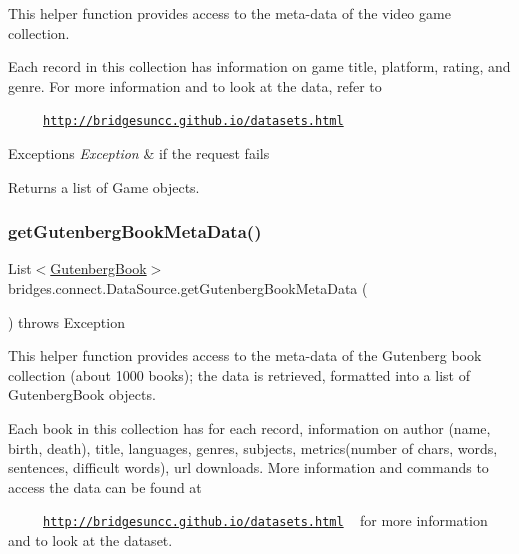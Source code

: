 This helper function provides access to the meta-\/data of the video game collection.

Each record in this collection has information on game title, platform, rating, and genre. For more information and to look at the data, refer to 

~~~~~\href{http://bridgesuncc.github.io/datasets.html}{\tt http\+://bridgesuncc.\+github.\+io/datasets.\+html} 


\begin{DoxyExceptions}{Exceptions}
{\em Exception} & if the request fails\\
\hline
\end{DoxyExceptions}
\begin{DoxyReturn}{Returns}
a list of Game objects. 
\end{DoxyReturn}
\mbox{\label{classbridges_1_1connect_1_1_data_source_aff3adc9d08624062469315f2fe059044}} 
\subsubsection{\texorpdfstring{get\+Gutenberg\+Book\+Meta\+Data()}{getGutenbergBookMetaData()}}
{\footnotesize\ttfamily List$<$\hyperlink{classbridges_1_1data__src__dependent_1_1_gutenberg_book}{Gutenberg\+Book}$>$ bridges.\+connect.\+Data\+Source.\+get\+Gutenberg\+Book\+Meta\+Data (\begin{DoxyParamCaption}{ }\end{DoxyParamCaption}) throws Exception}

This helper function provides access to the meta-\/data of the Gutenberg book collection (about 1000 books); the data is retrieved, formatted into a list of Gutenberg\+Book objects.

Each book in this collection has for each record, information on author (name, birth, death), title, languages, genres, subjects, metrics(number of chars, words, sentences, difficult words), url downloads. More information and commands to access the data can be found at 

~~~~~\href{http://bridgesuncc.github.io/datasets.html}{\tt http\+://bridgesuncc.\+github.\+io/datasets.\+html} ~\newline
 for more information and to look at the dataset.


